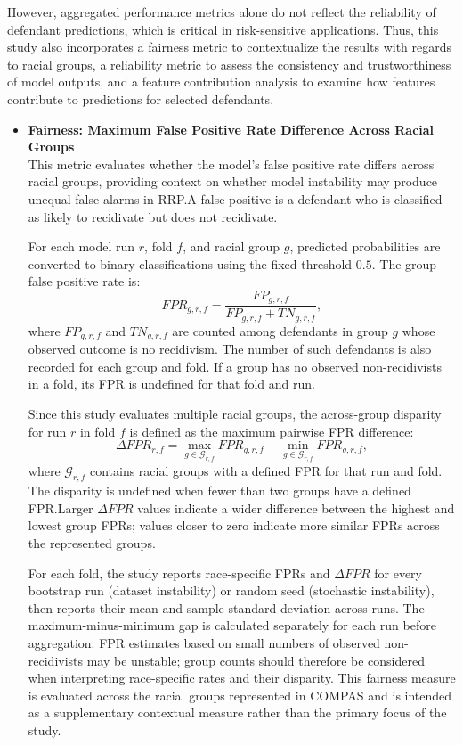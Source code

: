\documentclass[12pt]{article}
\begin{document}
However, aggregated performance metrics alone do not reflect the reliability of  defendant predictions, which is critical in risk-sensitive applications. Thus, this study also incorporates a fairness metric to contextualize the results with regards to racial groups, a reliability metric to assess the consistency and trustworthiness of model outputs, and a feature contribution analysis to examine how features contribute to predictions for selected defendants.

\begin{itemize}
  \item \textbf{Fairness: Maximum False Positive Rate Difference Across Racial Groups}\\
  \tabto{2em} This metric evaluates whether the model's false positive rate differs across racial groups, providing context on whether model instability may produce unequal false alarms in RRP.\@ A false positive is a defendant who is classified as likely to recidivate but does not recidivate.

  For each model run $r$, fold $f$, and racial group $g$, predicted probabilities are converted to binary classifications using the fixed threshold $0.5$. The group false positive rate is:
  \[
  FPR_{g,r,f} = \frac{FP_{g,r,f}}{FP_{g,r,f} + TN_{g,r,f}},
  \]
  where $FP_{g,r,f}$ and $TN_{g,r,f}$ are counted among defendants in group $g$ whose observed outcome is no recidivism. The number of such defendants is also recorded for each group and fold. If a group has no observed non-recidivists in a fold, its FPR is undefined for that fold and run.

  Since this study evaluates multiple racial groups, the across-group disparity for run $r$ in fold $f$ is defined as the maximum pairwise FPR difference:
  \[
  \Delta FPR_{r,f} = \max_{g \in \mathcal{G}_{r,f}} FPR_{g,r,f} - \min_{g \in \mathcal{G}_{r,f}} FPR_{g,r,f},
  \]
  where $\mathcal{G}_{r,f}$ contains racial groups with a defined FPR for that run and fold. The disparity is undefined when fewer than two groups have a defined FPR.\@ Larger $\Delta FPR$ values indicate a wider difference between the highest and lowest group FPRs; values closer to zero indicate more similar FPRs across the represented groups.

  For each fold, the study reports race-specific FPRs and $\Delta FPR$ for every bootstrap run (dataset instability) or random seed (stochastic instability), then reports their mean and sample standard deviation across runs. The maximum-minus-minimum gap is calculated separately for each run before aggregation. FPR estimates based on small numbers of observed non-recidivists may be unstable; group counts should therefore be considered when interpreting race-specific rates and their disparity. This fairness measure is evaluated across the racial groups represented in COMPAS and is intended as a supplementary contextual measure rather than the primary focus of the study.


\end{itemize}
\end{document}

